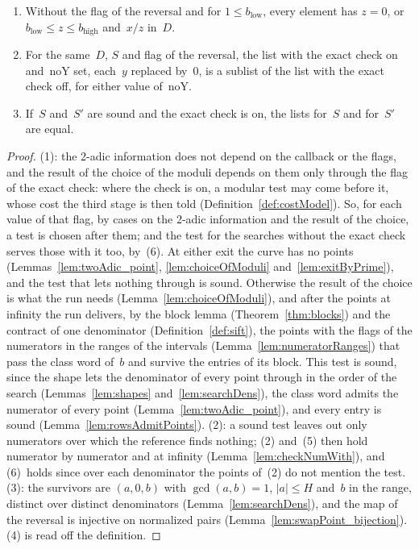 \begin{lemma}
\begin{enumerate}
      normalized and of height at most~$H$, and the list has no duplicates.
    \item Without the flag of the reversal and for $1 \le b_{\mathrm{low}}$, every element has
      $z = 0$, or $b_{\mathrm{low}} \le z \le b_{\mathrm{high}}$ and~$x/z$ in~$D$.
    \item For the same~$D$, $S$ and flag of the reversal, the list with the exact check on
      and~$\mathrm{noY}$ set, each~$y$ replaced by~$0$, is a sublist of the list with the exact
      check off, for either value of~$\mathrm{noY}$.
    \item If~$S$ and~$S'$ are sound and the exact check is on, the lists for~$S$ and for~$S'$ are
      equal.
  \end{enumerate}
\end{lemma}

\begin{proof}
  \leanok
  (1): the 2-adic information does not depend on the callback or the flags, and the result of the
  choice of the moduli depends on them only through the flag of the exact check: where the check is
  on, a modular test may come before it, whose cost the third stage is then told
  (Definition~\ref{def:costModel}). So, for each value of that flag, by cases on the 2-adic
  information and the result of the choice, a test is chosen after them; and the test for the
  searches without the exact check serves those with it too, by~(6). At either exit the curve has no
  points (Lemmas~\ref{lem:twoAdic_point}, \ref{lem:choiceOfModuli} and~\ref{lem:exitByPrime}), and
  the test that lets nothing through is sound. Otherwise the result of the choice is what the run
  needs (Lemma~\ref{lem:choiceOfModuli}), and after the points at infinity the run delivers, by the
  block lemma (Theorem~\ref{thm:blocks}) and the contract of one denominator
  (Definition~\ref{def:sift}), the points with the flags of the numerators in the ranges of the
  intervals (Lemma~\ref{lem:numeratorRanges}) that pass the class word of~$b$ and survive the
  entries of its block. This test is sound, since the shape lets the denominator of every point
  through in the order of the search (Lemmas~\ref{lem:shapes} and~\ref{lem:searchDens}), the class
  word admits the numerator of every point (Lemma~\ref{lem:twoAdic_point}), and every entry is sound
  (Lemma~\ref{lem:rowsAdmitPoints}). (2): a sound test leaves out only numerators over which the
  reference finds nothing; (2) and~(5) then hold numerator by numerator and at infinity
  (Lemma~\ref{lem:checkNumWith}), and (6)~holds since over each denominator the points of~(2) do not
  mention the test. (3): the survivors are $(a, 0, b)$ with $\gcd(a, b) = 1$, $|a| \le H$ and~$b$ in
  the range, distinct over distinct denominators (Lemma~\ref{lem:searchDens}), and the map of the
  reversal is injective on normalized pairs (Lemma~\ref{lem:swapPoint_bijection}). (4) is read off
  the definition.
\end{proof}

